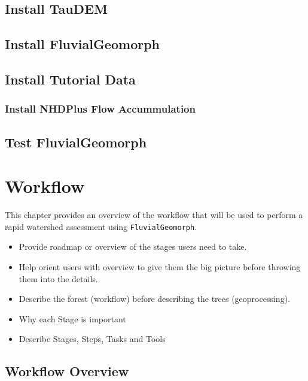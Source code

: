 \documentclass[]{book}
\providecommand{\tightlist}{%
  \setlength{\itemsep}{0pt}\setlength{\parskip}{0pt}}
\theoremstyle{definition}
\theoremstyle{definition}
\theoremstyle{definition}
\theoremstyle{remark}
\begin{document}
\section{Install TauDEM}\label{install-taudem}

\section{Install FluvialGeomorph}\label{install-fluvialgeomorph}

\section{Install Tutorial Data}\label{install-tutorial-data}

\subsection{Install NHDPlus Flow
Accummulation}\label{install-nhdplus-flow-accummulation}

\section{Test FluvialGeomorph}\label{test-fluvialgeomorph}

\chapter{Workflow}\label{workflow}

This chapter provides an overview of the workflow that will be used to
perform a rapid watershed assessment using \texttt{FluvialGeomorph}.

\begin{itemize}
\tightlist
\item
  Provide roadmap or overview of the stages users need to take.
\item
  Help orient users with overview to give them the big picture before
  throwing them into the details.
\item
  Describe the forest (workflow) before describing the trees
  (geoprocessing).\\
\item
  Why each Stage is important
\item
  Describe Stages, Steps, Tasks and Tools
\end{itemize}

\section{Workflow Overview}\label{workflow-overview}
\end{document}
